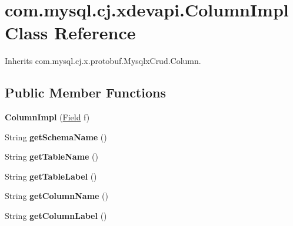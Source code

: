 \hypertarget{classcom_1_1mysql_1_1cj_1_1xdevapi_1_1_column_impl}{}\section{com.\+mysql.\+cj.\+xdevapi.\+Column\+Impl Class Reference}
\label{classcom_1_1mysql_1_1cj_1_1xdevapi_1_1_column_impl}


Inherits com.\+mysql.\+cj.\+x.\+protobuf.\+Mysqlx\+Crud.\+Column.

\subsection*{Public Member Functions}
\begin{DoxyCompactItemize}
\item 
\mbox{\label{classcom_1_1mysql_1_1cj_1_1xdevapi_1_1_column_impl_ab6b38221345090a79280015607816b56}} 
{\bfseries Column\+Impl} (\mbox{\hyperlink{classcom_1_1mysql_1_1cj_1_1result_1_1_field}{Field}} f)
\item 
\mbox{\label{classcom_1_1mysql_1_1cj_1_1xdevapi_1_1_column_impl_a355c7675aea90dbe7f776bf35da8aea6}} 
String {\bfseries get\+Schema\+Name} ()
\item 
\mbox{\label{classcom_1_1mysql_1_1cj_1_1xdevapi_1_1_column_impl_a0a5ca0805117abdd3cb8e9b1df835f5b}} 
String {\bfseries get\+Table\+Name} ()
\item 
\mbox{\label{classcom_1_1mysql_1_1cj_1_1xdevapi_1_1_column_impl_a1bd658c2a13dce3547e237ea613dd3a5}} 
String {\bfseries get\+Table\+Label} ()
\item 
\mbox{\label{classcom_1_1mysql_1_1cj_1_1xdevapi_1_1_column_impl_a1b7de47a2cf22b8deae3b742c94bf072}} 
String {\bfseries get\+Column\+Name} ()
\item 
\mbox{\label{classcom_1_1mysql_1_1cj_1_1xdevapi_1_1_column_impl_ad9fd6f38b364e909a466db6797dbee17}} 
String {\bfseries get\+Column\+Label} ()

\end{DoxyCompactItemize}
